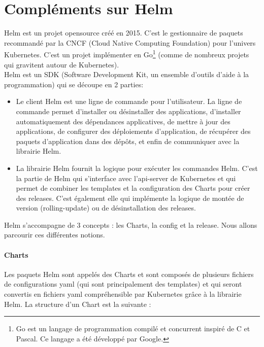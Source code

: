 \documentclass[11pt,fleqn]{book} %
\begin{document}
\chapter{Compléments sur Helm}
\label{Helm}
\vspace{-2cm}
Helm est un projet opensource créé en 2015. C'est le gestionnaire de paquets recommandé par la CNCF (Cloud Native Computing Foundation) pour l'univers Kubernetes. C'est un projet implémenter en Go\footnote{Go est un langage de programmation compilé et concurrent inspiré de C et Pascal. Ce langage a été développé par Google.} (comme de nombreux projets qui gravitent autour de Kubernetes).\\

Helm est un SDK (Software Development Kit, un ensemble d’outils d’aide à la programmation) qui se découpe en 2 parties: 
\begin{itemize}
    \item Le client Helm est une ligne de commande pour l'utilisateur. La ligne de commande permet d'installer ou désinstaller des applications, d'installer automatiquement des dépendances applicatives, de mettre à jour des applications, de configurer des déploiements d'application, de récupérer des paquets d'application dans des dépôts, et enfin de communiquer avec la librairie Helm.
    \item La librairie Helm fournit la logique pour exécuter les commandes Helm. C'est la partie de Helm qui s'interface avec l'api-server de Kubernetes et qui permet de combiner les templates et la configuration des Charts pour créer des releases. C'est également elle qui implémente la logique de montée de version (rolling-update) ou de désinstallation des releases.
\end{itemize}

Helm s'accompagne de 3 concepts : les Charts, la config et la release. Nous allons parcourir ces différentes notions.

\subsubsection{Charts}
Les paquets Helm sont appelés des Charts et sont composés de plusieurs fichiers de configurations yaml (qui sont principalement des templates) et qui seront convertis en fichiers yaml compréhensible par Kubernetes grâce à la librairie Helm. La structure d'un Chart est la suivante :
\end{document}
